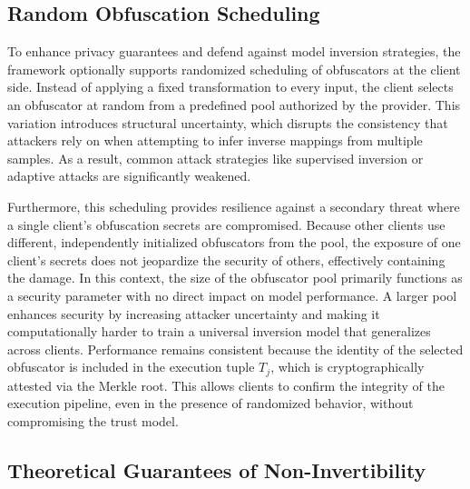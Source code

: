 \documentclass{ieeeaccess}
\begin{document}
\subsection{Random Obfuscation Scheduling}
{To enhance privacy guarantees and defend against model inversion strategies, the framework optionally supports randomized scheduling of obfuscators at the client side. Instead of applying a fixed transformation to every input, the client selects an obfuscator at random from a predefined pool authorized by the provider. This variation introduces structural uncertainty, which disrupts the consistency that attackers rely on when attempting to infer inverse mappings from multiple samples. As a result, common attack strategies like supervised inversion or adaptive attacks are significantly weakened.

Furthermore, this scheduling provides resilience against a secondary threat where a single client's obfuscation secrets are compromised. Because other clients use different, independently initialized obfuscators from the pool, the exposure of one client’s secrets does not jeopardize the security of others, effectively containing the damage. In this context, the size of the obfuscator pool primarily functions as a security parameter with no direct impact on model performance. A larger pool enhances security by increasing attacker uncertainty and making it computationally harder to train a universal inversion model that generalizes across clients. Performance remains consistent because the identity of the selected obfuscator is included in the execution tuple $T_j$, which is cryptographically attested via the Merkle root. This allows clients to confirm the integrity of the execution pipeline, even in the presence of randomized behavior, without compromising the trust model.}

\subsection{Theoretical Guarantees of Non-Invertibility}\label{sec:non-inv}
\end{document}
